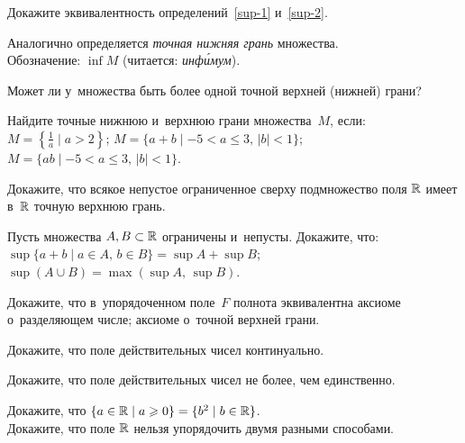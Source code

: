 \documentclass[a4paper,12pt]{article}
\begin{document}
Докажите эквивалентность определений~\ref{sup-1} и~\ref{sup-2}.

Аналогично определяется \emph{точная нижняя грань} множества.\\
Обозначение: $\inf M$ (читается: \emph{инф\'имум}).

Может ли у~множества быть более одной точной верхней (нижней) грани?

Найдите точные нижнюю и~верхнюю грани множества~$M$, если:\\
$M=\left\{\frac{1}{a} \mid a>2 \right\}$;
$M=\{a+b \mid -5 < a \le 3,\, |b| < 1\}$;
$M=\{ab \mid -5 < a \le 3,\, |b| < 1\}$.

Докажите, что всякое непустое ограниченное сверху подмножество поля $\mathbb{R}$ имеет в~$\mathbb{R}$ точную верхнюю грань.

Пусть множества $A,B\subset\mathbb{R}$ ограничены и~непусты. Докажите, что:\\
$\sup\{a+b \mid a\in A,\, b\in B\}=\sup A +\sup B$;
$\sup(A\cup B)=\max(\sup A,\,\sup B)$.

Докажите, что в~упорядоченном поле~$F$ полнота эквивалентна
аксиоме о~разделяющем числе;
аксиоме о~точной верхней грани.

Докажите, что поле действительных чисел континуально.

Докажите, что поле действительных чисел не более, чем единственно.

Докажите, что $\{a\in\mathbb{R}\mid a\geqslant0\} = \{b^2\mid b\in\mathbb{R}\}$.
\\
Докажите, что поле $\mathbb{R}$ нельзя упорядочить двумя разными способами.


{}
\GenXMLW
\immediate{}
\end{document}
